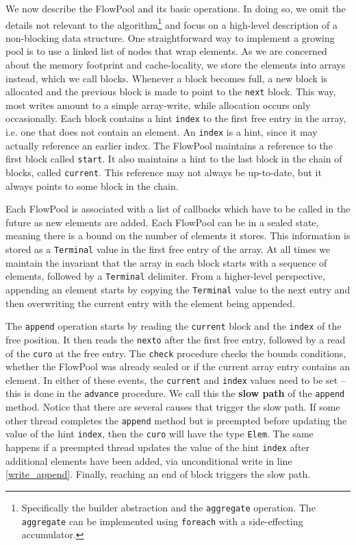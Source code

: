 \documentclass[runningheads,a4paper]{llncs}
\begin{document}
We now describe the FlowPool and its basic operations.
In doing so, we omit the details not relevant to the
algorithm\footnote{Specifically the builder abstraction and the \texttt{aggregate}
operation. The \texttt{aggregate} can be implemented using \texttt{foreach}
with a side-effecting accumulator.}
and focus on a high-level description of a non-blocking
data structure.
One straightforward way to implement a growing pool is to use a linked
list of nodes that wrap elements.
As we are concerned about the memory footprint and cache-locality, we
store the elements into arrays instead, which we call blocks.
Whenever a block becomes full, a new block is allocated and the
previous block is made to point to the \verb=next= block.
This way, most writes amount to a simple array-write, while allocation
occurs only occasionally.
Each block contains a hint \verb=index= to the first free entry in
the array, i.e. one that does not contain an element.
An \verb=index= is a hint, since it may actually reference an earlier index.
The FlowPool maintains a reference to the first block called
\verb=start=.
It also maintains a hint to the last block in the chain of blocks,
called \verb=current=.
This reference may not always be up-to-date, but it always points
to some block in the chain.

Each FlowPool is associated with a list of callbacks which have
to be called in the future as new elements are added.
Each FlowPool can be in a sealed state, meaning there is a bound on
the number of elements it stores.
This information is stored as a \verb=Terminal= value in the first
free entry of the array.
At all times we maintain the invariant that the array in each block
starts with a sequence of elements, followed by a \verb=Terminal=
delimiter. From a higher-level perspective, appending an element
starts by copying the \verb=Terminal= value to the next entry and then
overwriting the current entry with the element being appended.

The \verb=append= operation starts by reading the \verb=current= block
and the \verb=index= of the free position.
It then reads the
\verb=nexto= after the first free entry, followed by a read of the
\verb=curo= at the free entry.
The \verb=check= procedure checks the bounds conditions, whether the
FlowPool was already sealed or if the current array entry contains an
element.
In either of these events, the \verb=current= and \verb=index= values
need to be set -- this is done in the \verb=advance= procedure.
We call this the \textbf{slow path} of the \verb=append= method.
Notice that there are several causes that trigger the slow path.
If some other thread completes the \verb=append= method but is
preempted before updating the value of the hint \verb=index=, then the
\verb=curo= will have the type \verb=Elem=.
The same happens if a preempted thread updates the value of the
hint \verb=index= after additional elements have been added,
via unconditional write in line \ref{write_append}.
Finally, reaching an end of block triggers the slow path.
\end{document}
